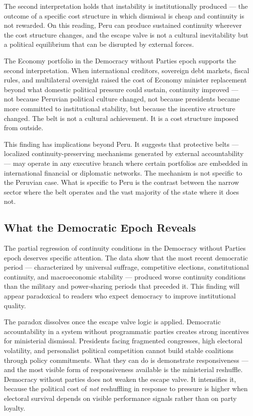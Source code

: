 \documentclass[doc, 12pt, a4paper,floatsintext]{apa7}
\begin{document}
The second interpretation holds that instability is institutionally 
produced --- the outcome of a specific cost structure in which 
dismissal is cheap and continuity is not rewarded. On this reading, 
Peru can produce sustained continuity wherever the cost structure 
changes, and the escape valve is not a cultural inevitability but 
a political equilibrium that can be disrupted by external forces.

The Economy portfolio in the Democracy without Parties epoch 
supports the second interpretation. When international creditors, 
sovereign debt markets, fiscal rules, and multilateral oversight 
raised the cost of Economy minister replacement beyond what 
domestic political pressure could sustain, continuity improved --- 
not because Peruvian political culture changed, not because 
presidents became more committed to institutional stability, but 
because the incentive structure changed. The belt is not a 
cultural achievement. It is a cost structure imposed from outside.

This finding has implications beyond Peru. It suggests that 
protective belts --- localized continuity-preserving mechanisms 
generated by external accountability --- may operate in any 
executive branch where certain portfolios are embedded in 
international financial or diplomatic networks. The mechanism is 
not specific to the Peruvian case. What is specific to Peru is 
the contrast between the narrow sector where the belt operates 
and the vast majority of the state where it does not.

\subsection{What the Democratic Epoch Reveals}

The partial regression of continuity conditions in the Democracy 
without Parties epoch deserves specific attention. The data show 
that the most recent democratic period --- characterized by 
universal suffrage, competitive elections, constitutional 
continuity, and macroeconomic stability --- produced worse 
continuity conditions than the military and power-sharing periods 
that preceded it. This finding will appear paradoxical to readers 
who expect democracy to improve institutional quality.

The paradox dissolves once the escape valve logic is applied. 
Democratic accountability in a system without programmatic parties 
creates strong incentives for ministerial dismissal. Presidents 
facing fragmented congresses, high electoral volatility, and 
personalist political competition cannot build stable coalitions 
through policy commitments. What they can do is demonstrate 
responsiveness --- and the most visible form of responsiveness 
available is the ministerial reshuffle. Democracy without parties 
does not weaken the escape valve. It intensifies it, because the 
political cost of \emph{not} reshuffling in response to pressure 
is higher when electoral survival depends on visible performance 
signals rather than on party loyalty.
\end{document}
